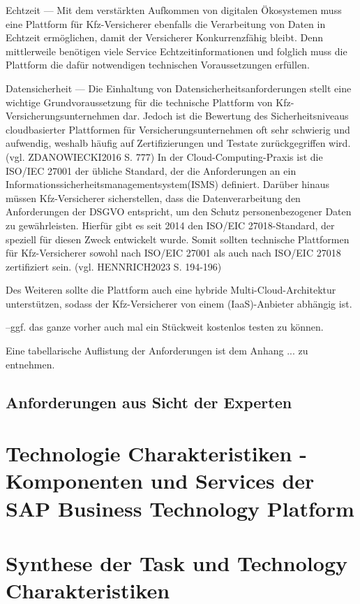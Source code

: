 Echtzeit --- Mit dem verstärkten Aufkommen von digitalen Ökosystemen muss eine Plattform für Kfz-Versicherer ebenfalls die Verarbeitung von Daten in Echtzeit ermöglichen, damit der Versicherer Konkurrenzfähig bleibt. Denn mittlerweile benötigen viele Service Echtzeitinformationen und folglich muss die Plattform die dafür notwendigen technischen Voraussetzungen erfüllen. 

Datensicherheit --- Die Einhaltung von Datensicherheitsanforderungen stellt eine wichtige Grundvoraussetzung für die technische Plattform von Kfz-Versicherungsunternehmen dar. Jedoch ist  die Bewertung des Sicherheitsniveaus cloudbasierter Plattformen für Versicherungsunternehmen oft sehr schwierig und aufwendig, weshalb häufig auf Zertifizierungen und Testate zurückgegriffen wird. (vgl. ZDANOWIECKI2016 S. 777) In der Cloud-Computing-Praxis ist die ISO/IEC 27001 der übliche Standard, der die Anforderungen an ein Informationssicherheitsmanagementsystem(ISMS) definiert. Darüber hinaus müssen Kfz-Versicherer sicherstellen, dass die Datenverarbeitung den Anforderungen der DSGVO entspricht, um den Schutz personenbezogener Daten zu gewährleisten. Hierfür gibt es seit 2014 den ISO/EIC 27018-Standard, der speziell für diesen Zweck entwickelt wurde. Somit sollten technische Plattformen für Kfz-Versicherer sowohl nach ISO/EIC 27001 als auch nach ISO/EIC 27018 zertifiziert sein. (vgl. HENNRICH2023 S. 194-196)

Des Weiteren sollte die Plattform auch eine hybride Multi-Cloud-Architektur unterstützen, sodass der Kfz-Versicherer von einem (IaaS)-Anbieter abhängig ist.

--ggf. das ganze vorher auch mal ein Stückweit kostenlos testen zu können.

Eine tabellarische Auflistung der Anforderungen ist dem Anhang ... zu entnehmen.











\subsection{Anforderungen aus Sicht der Experten}

\section{Technologie Charakteristiken - Komponenten und Services der SAP Business Technology Platform}

\section{Synthese der Task und Technology Charakteristiken}


